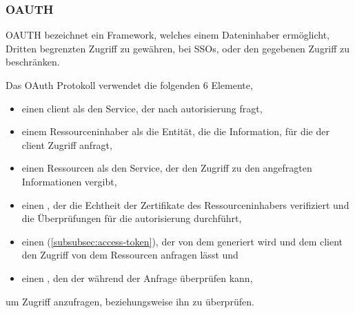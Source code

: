 \subsubsection[OAuth]{\acf{OAUTH}}\label{subsubsec:oauth}
\ac{OAUTH} bezeichnet ein Framework, welches einem Dateninhaber ermöglicht, Dritten begrenzten Zugriff zu gewähren, \zbol bei \acp{SSO}, oder den gegebenen Zugriff zu beschränken.\autocites[\vglf][]{rfc6749}[\vglf][]{OAuthWebProtocol:2012}

Das OAuth Protokoll verwendet die folgenden 6 Elemente,
\begin{itemize}
    \item einen \gls{client} als den Service, der nach \gls{autorisierung} fragt,
    \item einem Ressourceninhaber als die Entität, die die Information, für die der \gls{client} Zugriff anfragt,
    \item  einen Ressourcen als den Service, der den Zugriff zu den angefragten Informationen vergibt,
    \item einen , der die Echtheit der Zertifikate des Ressourceninhabers verifiziert und die Überprüfungen für die \gls{autorisierung} durchführt,
    \item einen  (\autoref{subsubsec:access-token}), der von dem  generiert wird und dem \gls{client} den Zugriff von dem Ressourcen anfragen lässt und
    \item einen , den der  während der Anfrage überprüfen kann,
\end{itemize}
um Zugriff anzufragen, beziehungsweise ihn zu überprüfen. \autocite[\vglf][]{OAuthWebProtocol:2012}

